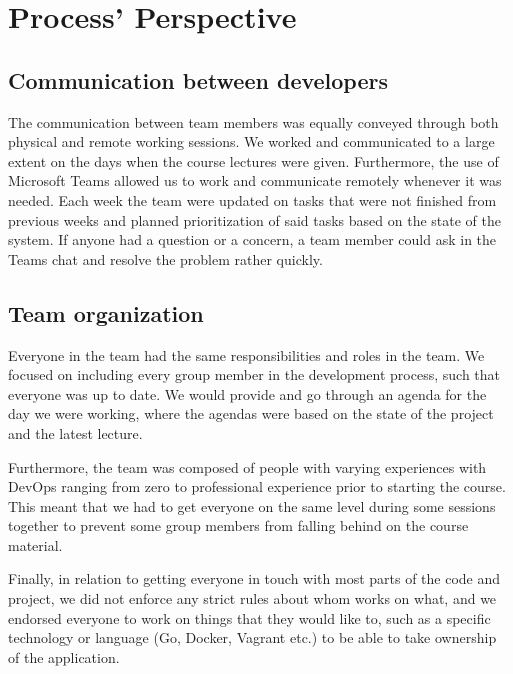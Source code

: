 \section{Process' Perspective}
\label{process-perspective}

\subsection{Communication between developers}

The communication between team members was equally conveyed through both physical and remote working sessions. We worked and communicated to a large extent on the days when the course lectures were given. Furthermore, the use of Microsoft Teams allowed us to work and communicate remotely whenever it was needed. Each week the team were updated on tasks that were not finished from previous weeks and planned prioritization of said tasks based on the state of the system. If anyone had a question or a concern, a team member could ask in the Teams chat and resolve the problem rather quickly.  

\subsection{Team organization}

Everyone in the team had the same responsibilities and roles in the team. We focused on including every group member in the development process, such that everyone was up to date. We would provide and go through an agenda for the day we were working, where the agendas were based on the state of the project and the latest lecture. 

Furthermore, the team was composed of people with varying experiences with DevOps ranging from zero to professional experience prior to starting the course. This meant that we had to get everyone on the same level during some sessions together to prevent some group members from falling behind on the course material. 

Finally, in relation to getting everyone in touch with most parts of the code and project, we did not enforce any strict rules about whom works on what, and we endorsed everyone to work on things that they would like to, such as a specific technology or language (Go, Docker, Vagrant etc.) to be able to take ownership of the application.


